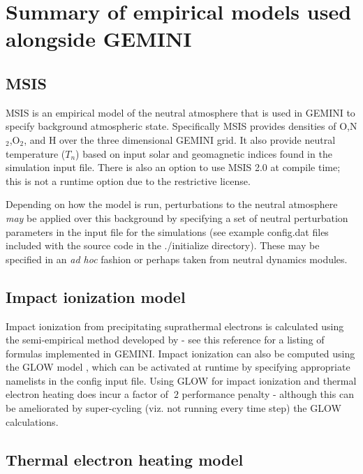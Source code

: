 \documentclass[11pt,letterpaper]{article}
\begin{document}
\section{Summary of empirical models used alongside GEMINI}

\subsection{MSIS}

MSIS is an empirical model of the neutral atmosphere \citep{Picone:2002} that is used in GEMINI to specify background atmospheric state.  Specifically MSIS provides densities of O,N$_2$,O$_2$, and H over the three dimensional GEMINI grid.  It also provide neutral temperature ($T_n$) based on input solar and geomagnetic indices found in the simulation input file.  There is also an option to use MSIS 2.0 at compile time; this is not a runtime option due to the restrictive license.  

Depending on how the model is run, perturbations to the neutral atmosphere \emph{may} be applied over this background by specifying a set of neutral perturbation parameters in the input file for the simulations (see example config.dat files included with the source code in the ./initialize directory).  These may be specified in an \emph{ad hoc} fashion or perhaps taken from neutral dynamics modules.  


\subsection{Impact ionization model} \label{sec:impact}

Impact ionization from precipitating suprathermal electrons is calculated using the semi-empirical method developed by \citet{Fang:2008} - see this reference for a listing of formulas implemented in GEMINI.  Impact ionization can also be computed using the GLOW model \citep{Solomon:2017}, which can be activated at runtime by specifying appropriate namelists in the config input file.  Using GLOW for impact ionization and thermal electron heating does incur a factor of $~2$ performance penalty - although this can be ameliorated by super-cycling (viz. not running every time step) the GLOW calculations.  


\subsection{Thermal electron heating model}
\end{document}
